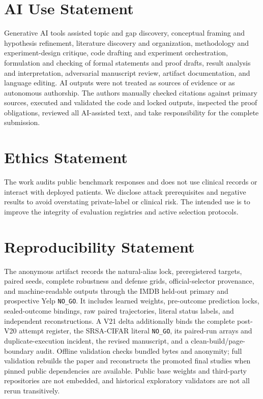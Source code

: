 \section*{AI Use Statement}
Generative AI tools assisted topic and gap discovery, conceptual framing and hypothesis refinement, literature discovery and organization, methodology and experiment-design critique, code drafting and experiment orchestration, formulation and checking of formal statements and proof drafts, result analysis and interpretation, adversarial manuscript review, artifact documentation, and language editing. AI outputs were not treated as sources of evidence or as autonomous authorship. The authors manually checked citations against primary sources, executed and validated the code and locked outputs, inspected the proof obligations, reviewed all AI-assisted text, and take responsibility for the complete submission.

\section*{Ethics Statement}
The work audits public benchmark responses and does not use clinical records or interact with deployed patients. We disclose attack prerequisites and negative results to avoid overstating private-label or clinical risk. The intended use is to improve the integrity of evaluation registries and active selection protocols.

\section*{Reproducibility Statement}
The anonymous artifact records the natural-alias lock, preregistered targets, paired seeds, complete robustness and defense grids, official-selector provenance, and machine-readable outputs through the IMDB held-out primary and prospective Yelp \texttt{NO\_GO}. It includes learned weights, pre-outcome prediction locks, sealed-outcome bindings, raw paired trajectories, literal status labels, and independent reconstructions. A V21 delta additionally binds the complete post-V20 attempt register, the SRSA-CIFAR literal \texttt{NO\_GO}, its paired-run arrays and duplicate-execution incident, the revised manuscript, and a clean-build/page-boundary audit. Offline validation checks bundled bytes and anonymity; full validation rebuilds the paper and reconstructs the promoted final studies when pinned public dependencies are available. Public base weights and third-party repositories are not embedded, and historical exploratory validators are not all rerun transitively.
